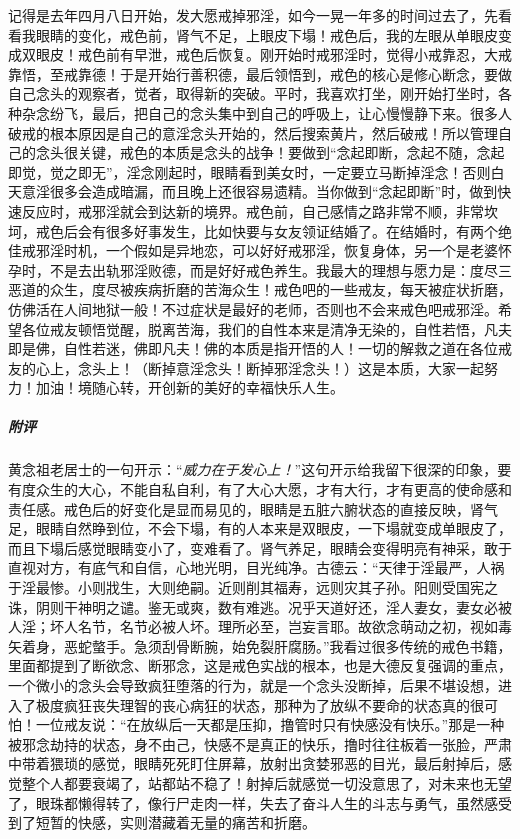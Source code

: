 \begin{case}
    记得是去年四月八日开始，发大愿戒掉邪淫，如今一晃一年多的时间过去了，先看看我眼睛的变化，戒色前，肾气不足，上眼皮下塌！戒色后，我的左眼从单眼皮变成双眼皮！戒色前有早泄，戒色后恢复。刚开始时戒邪淫时，觉得小戒靠忍，大戒靠悟，至戒靠德！于是开始行善积德，最后领悟到，戒色的核心是修心断念，要做自己念头的观察者，觉者，取得新的突破。平时，我喜欢打坐，刚开始打坐时，各种杂念纷飞，最后，把自己的念头集中到自己的呼吸上，让心慢慢静下来。很多人破戒的根本原因是自己的意淫念头开始的，然后搜索黄片，然后破戒！所以管理自己的念头很关键，戒色的本质是念头的战争！要做到“念起即断，念起不随，念起即觉，觉之即无”，淫念刚起时，眼睛看到美女时，一定要立马断掉淫念！否则白天意淫很多会造成暗漏，而且晚上还很容易遗精。当你做到“念起即断”时，做到快速反应时，戒邪淫就会到达新的境界。戒色前，自己感情之路非常不顺，非常坎坷，戒色后会有很多好事发生，比如快要与女友领证结婚了。在结婚时，有两个绝佳戒邪淫时机，一个假如是异地恋，可以好好戒邪淫，恢复身体，另一个是老婆怀孕时，不是去出轨邪淫败德，而是好好戒色养生。我最大的理想与愿力是：度尽三恶道的众生，度尽被疾病折磨的苦海众生！戒色吧的一些戒友，每天被症状折磨，仿佛活在人间地狱一般！不过症状是最好的老师，否则也不会来戒色吧戒邪淫。希望各位戒友顿悟觉醒，脱离苦海，我们的自性本来是清净无染的，自性若悟，凡夫即是佛，自性若迷，佛即凡夫！佛的本质是指开悟的人！一切的解救之道在各位戒友的心上，念头上！（断掉意淫念头！断掉邪淫念头！）这是本质，大家一起努力！加油！境随心转，开创新的美好的幸福快乐人生。
    \subparagraph{附评} 黄念祖老居士的一句开示：“\textit{威力在于发心上！}”这句开示给我留下很深的印象，要有度众生的大心，不能自私自利，有了大心大愿，才有大行，才有更高的使命感和责任感。戒色后的好变化是显而易见的，眼睛是五脏六腑状态的直接反映，肾气足，眼睛自然睁到位，不会下塌，有的人本来是双眼皮，一下塌就变成单眼皮了，而且下塌后感觉眼睛变小了，变难看了。肾气养足，眼睛会变得明亮有神采，敢于直视对方，有底气和自信，心地光明，目光纯净。古德云：“天律于淫最严，人祸于淫最惨。小则戕生，大则绝嗣。近则削其福寿，远则灾其子孙。阳则受国宪之诛，阴则干神明之谴。鉴无或爽，数有难逃。况乎天道好还，淫人妻女，妻女必被人淫；坏人名节，名节必被人坏。理所必至，岂妄言耶。故欲念萌动之初，视如毒矢着身，恶蛇螫手。急须刮骨断腕，始免裂肝腐肠。”我看过很多传统的戒色书籍，里面都提到了断欲念、断邪念，这是戒色实战的根本，也是大德反复强调的重点，一个微小的念头会导致疯狂堕落的行为，就是一个念头没断掉，后果不堪设想，进入了极度疯狂丧失理智的丧心病狂的状态，那种为了放纵不要命的状态真的很可怕！一位戒友说：“在放纵后一天都是压抑，撸管时只有快感没有快乐。”那是一种被邪念劫持的状态，身不由己，快感不是真正的快乐，撸时往往板着一张脸，严肃中带着猥琐的感觉，眼睛死死盯住屏幕，放射出贪婪邪恶的目光，最后射掉后，感觉整个人都要衰竭了，站都站不稳了！射掉后就感觉一切没意思了，对未来也无望了，眼珠都懒得转了，像行尸走肉一样，失去了奋斗人生的斗志与勇气，虽然感受到了短暂的快感，实则潜藏着无量的痛苦和折磨。


\end{case}
